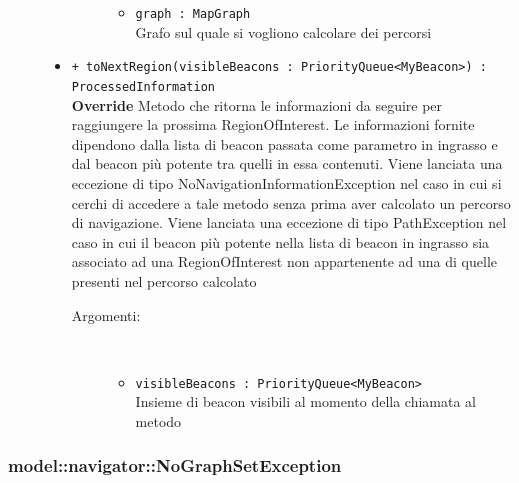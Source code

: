 \documentclass[../DefinizioneDiProdotto.tex]{subfiles}
\begin{document}
\begin{description}
\begin{itemize}
\begin{description}
\begin{itemize}
\item \texttt{graph : MapGraph}\\
Grafo sul quale si vogliono calcolare dei percorsi\end{itemize}
\end{description}
\item \texttt{+ toNextRegion(visibleBeacons : PriorityQueue<MyBeacon>) : ProcessedInformation}\\
\textbf{Override} Metodo che ritorna le informazioni da seguire per raggiungere la prossima RegionOfInterest. Le informazioni fornite dipendono dalla lista di beacon passata come parametro in ingrasso e dal beacon più potente tra quelli in essa contenuti. Viene lanciata una eccezione di tipo NoNavigationInformationException nel caso in cui si cerchi di accedere a tale metodo senza prima aver calcolato un percorso di navigazione. Viene lanciata una eccezione di tipo PathException nel caso in cui il beacon più potente nella lista di beacon in ingrasso sia associato ad una RegionOfInterest non appartenente ad una di quelle presenti nel percorso calcolato
 \begin{description}
\item[Argomenti:] \
\begin{itemize}
\item \texttt{visibleBeacons : PriorityQueue<MyBeacon>}\\
Insieme di beacon visibili al momento della chiamata al metodo\end{itemize}
\end{description}
\end{itemize}
\end{description}

\subsubsection{model::navigator::NoGraphSetException}
\end{document}
